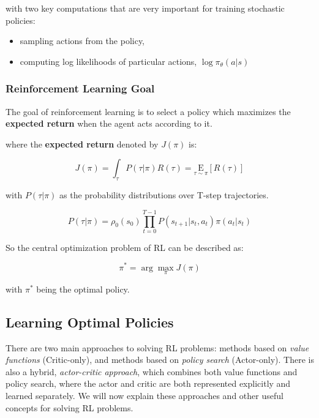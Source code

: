 with two key computations that are very important for training stochastic policies:
\begin{itemize}
		\item sampling actions from the policy,
		\item computing log likelihoods of particular actions, $ \log \pi_{\theta}(a|s) $
\end{itemize}


\subsubsection{Reinforcement Learning Goal}
The goal of reinforcement learning is to select a policy which maximizes the \textbf{expected return} when the agent acts according to it.

where the \textbf{expected return} denoted by $ J(\pi) $ is:
\begin{center}
		\begin{equation} \label{eq:expected_return}
				J(\pi)=\int_{\tau} P(\tau | \pi) R(\tau)=\underset{\tau \sim \pi}{\mathrm{E}}[R(\tau)]
		\end{equation}
\end{center}

with $ P(\tau | \pi) $ as the probability distributions over T-step trajectories.
\begin{center}
		\begin{equation}
				P(\tau | \pi)=\rho_{0}\left(s_{0}\right) \prod_{t=0}^{T-1} P\left(s_{t+1} | s_{t}, a_{t}\right) \pi\left(a_{t} | s_{t}\right)
		\end{equation}
\end{center}

So the central optimization problem of RL can be described as:
\begin{center}
		\begin{equation}
				\pi^{*}=\arg \max _{\pi} J(\pi)
		\end{equation}
\end{center}
with $\pi^*$ being the optimal policy.


\subsection{Learning Optimal Policies}
There are two main approaches to solving RL problems: methods based on \textit{value functions} (Critic-only), and methods based on \textit{policy search} (Actor-only).
There is also a hybrid, \textit{actor-critic approach}, which combines both value functions and policy search, where the actor and critic are both represented explicitly and learned separately.
We will now explain these approaches and other useful concepts for solving RL problems.

